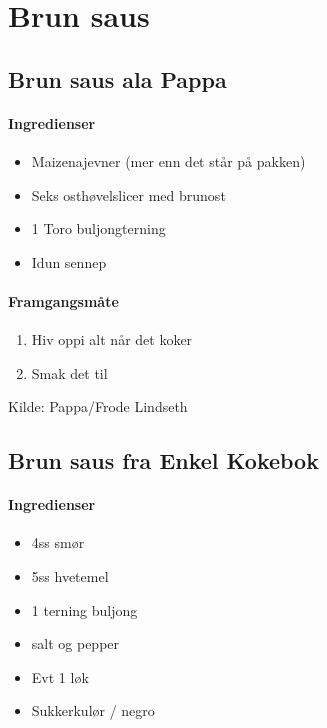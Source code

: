 \section{Brun saus}


\subsection{Brun saus ala Pappa}

\paragraph{Ingredienser}
\begin{itemize}[noitemsep]
	\item Maizenajevner (mer enn det står på pakken)
	\item Seks osthøvelslicer med brunost
	\item 1 Toro buljongterning
	\item Idun sennep
\end{itemize}


\paragraph{Framgangsmåte}
\begin{enumerate}[noitemsep]
	\item Hiv oppi alt når det koker
	\item Smak det til
\end{enumerate}

Kilde: Pappa/Frode Lindseth


\subsection{Brun saus fra Enkel Kokebok}
\paragraph{Ingredienser}
\begin{itemize}[noitemsep]
	\item 4ss smør
	\item 5ss hvetemel
	\item 1 terning buljong
	\item salt og pepper
	\item Evt 1 løk
	\item Sukkerkulør / negro
\end{itemize}


